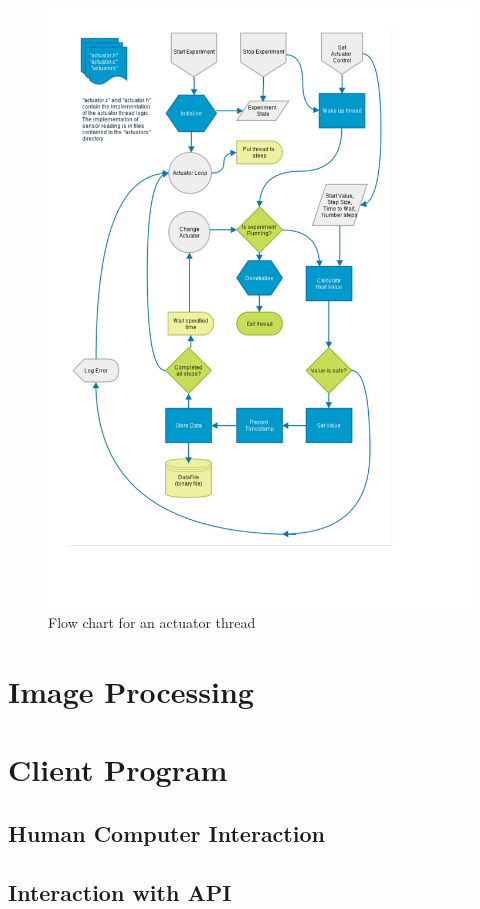 \begin{figure}[H]
	\centering
	\includegraphics[width=1.1\textwidth]{figures/actuator_thread.pdf}
	\caption{Flow chart for an actuator thread} 
	\label{actuator_thread.pdf}
\end{figure}
\pagebreak

\section{Image Processing}

\section{Client Program}

\subsection{Human Computer Interaction}

\subsection{Interaction with API}









